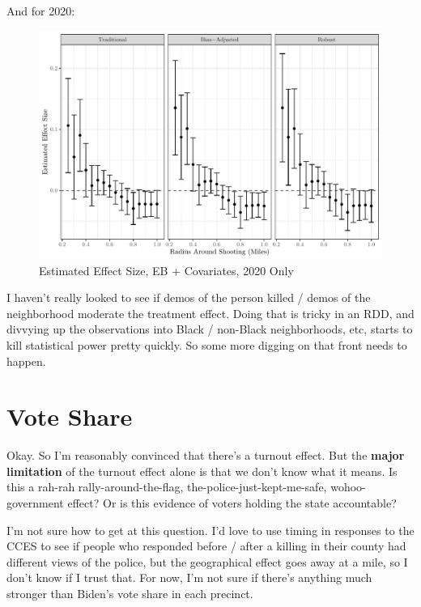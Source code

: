 \documentclass[
  12pt,
]{article}
\begin{document}
And for 2020:

\begin{figure}[H]

{\centering \includegraphics{shoot_to_files/figure-latex/dists-chunk20-1} 

}

\caption{\label{fig:map}Estimated Effect Size, EB + Covariates, 2020 Only}\label{fig:dists-chunk20}
\end{figure}

I haven't really looked to see if demos of the person killed / demos of the neighborhood moderate the treatment effect. Doing that is tricky in an RDD, and divvying up the observations into Black / non-Black neighborhoods, etc, starts to kill statistical power pretty quickly. So some more digging on that front needs to happen.

\hypertarget{vote-share}{%
\section*{Vote Share}\label{vote-share}}

Okay. So I'm reasonably convinced that there's a turnout effect. But the \textbf{major limitation} of the turnout effect alone is that we don't know what it means. Is this a rah-rah rally-around-the-flag, the-police-just-kept-me-safe, wohoo-government effect? Or is this evidence of voters holding the state accountable?

I'm not sure how to get at this question. I'd love to use timing in responses to the CCES to see if people who responded before / after a killing in their county had different views of the police, but the geographical effect goes away at a mile, so I don't know if I trust that. For now, I'm not sure if there's anything much stronger than Biden's vote share in each precinct.
\end{document}
